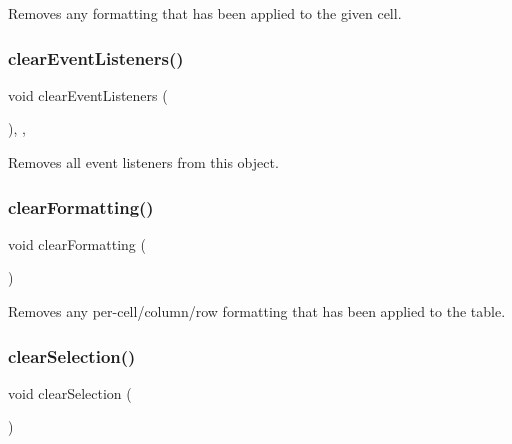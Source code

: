 Removes any formatting that has been applied to the given cell. 

\mbox{\label{classsgl_1_1GObservable_a80cfa040459ff53594adbd6a51ec8f43}} 
\subsubsection{\texorpdfstring{clear\+Event\+Listeners()}{clearEventListeners()}}
{\footnotesize\ttfamily void clear\+Event\+Listeners (\begin{DoxyParamCaption}{ }\end{DoxyParamCaption})\hspace{0.3cm}{\ttfamily [protected]}, {\ttfamily [virtual]}, {\ttfamily [inherited]}}



Removes all event listeners from this object. 

\mbox{\label{classsgl_1_1GTable_a07ea41be0cdc43ffcd09898d3ae5c523}} 
\subsubsection{\texorpdfstring{clear\+Formatting()}{clearFormatting()}}
{\footnotesize\ttfamily void clear\+Formatting (\begin{DoxyParamCaption}{ }\end{DoxyParamCaption})\hspace{0.3cm}{\ttfamily [virtual]}}



Removes any per-\/cell/column/row formatting that has been applied to the table. 

\mbox{\label{classsgl_1_1GTable_abd07e172ccec6823a88289c21124a367}} 
\subsubsection{\texorpdfstring{clear\+Selection()}{clearSelection()}}
{\footnotesize\ttfamily void clear\+Selection (\begin{DoxyParamCaption}{ }\end{DoxyParamCaption})\hspace{0.3cm}{\ttfamily [virtual]}}



